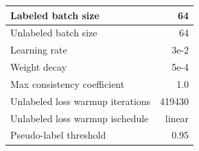 \begin{tabular}{L{\WWW}  R{\RRR}}
\\ \hline
Labeled batch size & 64
\\ \hline
Unlabeled batch size & 64
\\ \hline
Learning rate & 3e-2
\\ \hline
Weight decay & 5e-4
\\ \hline
Max consistency coefficient & 1.0
\\ \hline
Unlabeled loss warmup iterations & 419430
\\ \hline
Unlabeled loss warmup ischedule & linear
\\ \hline
Pseudo-label threshold & 0.95
\end{tabular}